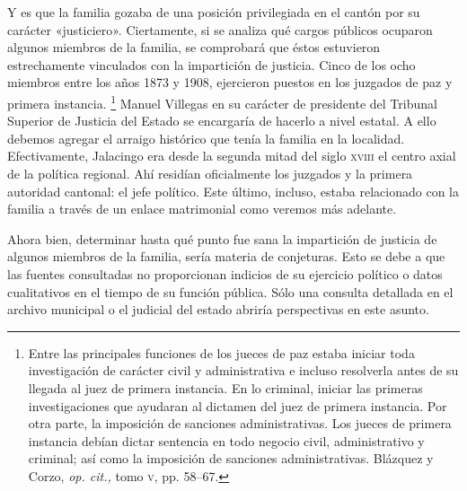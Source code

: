 \documentclass[14pt,twoside,final]{extbook} %
\let\oldfootnote\footnote
\renewcommand\footnote[1]{%
\oldfootnote{\hspace{1mm}#1}}
\begin{document}
Y es que la familia gozaba de una posición privilegiada en el cantón por su carácter «justiciero». Ciertamente, si se analiza qué cargos públicos ocuparon algunos miembros de la familia, se comprobará que éstos estuvieron estrechamente vinculados con la impartición de justicia. Cinco de los ocho miembros entre los años 1873 y 1908, ejercieron puestos en los juzgados de paz y primera instancia.\footnote{Entre las principales funciones de los jueces de paz estaba iniciar toda investigación de carácter civil y administrativa e incluso resolverla antes de su llegada al juez de primera instancia. En lo criminal, iniciar las primeras investigaciones que ayudaran al dictamen del juez de primera instancia. Por otra parte, la imposición de sanciones administrativas. Los jueces de primera instancia debían dictar sentencia en todo negocio civil, administrativo y criminal; así como la imposición de sanciones administrativas. Blázquez y Corzo, \emph{op. cit.,} tomo \textsc{v}, pp. 58--67.} Manuel Villegas en su carácter de presidente del Tribunal Superior de Justicia del Estado se encargaría de hacerlo a nivel estatal. A ello debemos agregar el arraigo histórico que tenía la familia en la localidad. Efectivamente, Jalacingo era desde la segunda mitad del siglo \textsc{xviii} el centro axial de la política regional. Ahí residían oficialmente los juzgados y la primera autoridad cantonal: el jefe político. Este último, incluso, estaba relacionado con la familia a través de un enlace matrimonial como veremos más adelante.

Ahora bien, determinar hasta qué punto fue sana la impartición de justicia de algunos miembros de la familia, sería materia de conjeturas. Esto se debe a que las fuentes consultadas no proporcionan indicios de su ejercicio político o datos cualitativos en el tiempo de su función pública. Sólo una consulta detallada en el archivo municipal o el judicial del estado abriría perspectivas en este asunto.
\end{document}
